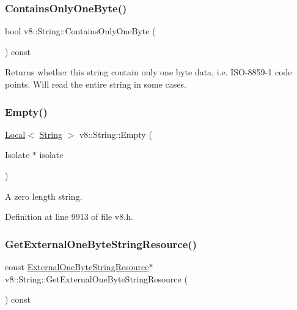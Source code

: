 \subsubsection{\texorpdfstring{Contains\+Only\+One\+Byte()}{ContainsOnlyOneByte()}}
{\footnotesize\ttfamily bool v8\+::\+String\+::\+Contains\+Only\+One\+Byte (\begin{DoxyParamCaption}{ }\end{DoxyParamCaption}) const}

Returns whether this string contain only one byte data, i.\+e. I\+S\+O-\/8859-\/1 code points. Will read the entire string in some cases. \mbox{\label{classv8_1_1String_aa393d47baa54467fe57001065e49194b}} 
\subsubsection{\texorpdfstring{Empty()}{Empty()}}
{\footnotesize\ttfamily \mbox{\hyperlink{classv8_1_1Local}{Local}}$<$ \mbox{\hyperlink{classv8_1_1String}{String}} $>$ v8\+::\+String\+::\+Empty (\begin{DoxyParamCaption}\item[{Isolate $\ast$}]{isolate }\end{DoxyParamCaption})\hspace{0.3cm}{\ttfamily [static]}}

A zero length string. 

Definition at line 9913 of file v8.\+h.

\mbox{\label{classv8_1_1String_af93d92ca10a216be472d1b7c20550f76}} 
\subsubsection{\texorpdfstring{Get\+External\+One\+Byte\+String\+Resource()}{GetExternalOneByteStringResource()}}
{\footnotesize\ttfamily const \mbox{\hyperlink{classv8_1_1String_1_1ExternalOneByteStringResource}{External\+One\+Byte\+String\+Resource}}$\ast$ v8\+::\+String\+::\+Get\+External\+One\+Byte\+String\+Resource (\begin{DoxyParamCaption}{ }\end{DoxyParamCaption}) const}

